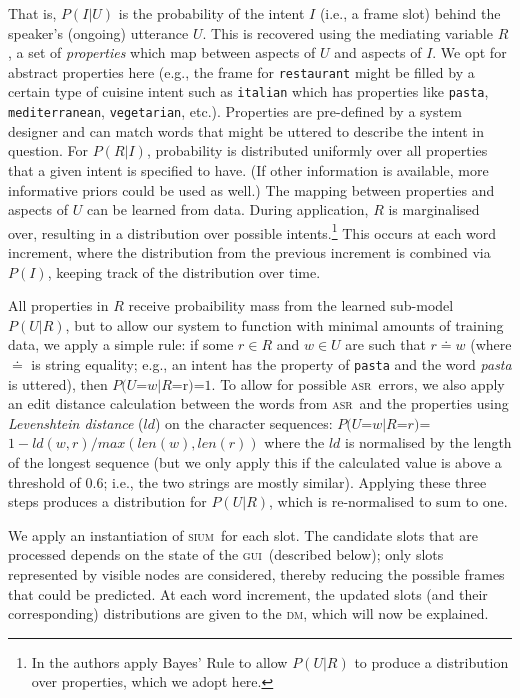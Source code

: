 \documentclass[11pt]{article}
\newcommand{\sium}[0]{\textsc{sium}}
\newcommand{\asr}[0]{\textsc{asr}}
\newcommand{\dm}[0]{\textsc{dm}}
\newcommand{\ui}[0]{\textsc{gui}}
\begin{document}
That is, $P(I|U)$ is the probability of the intent $I$ (i.e., a frame slot) behind the speaker's (ongoing) utterance $U$. This is recovered using the mediating variable $R$, a set of \emph{properties} which map between aspects of $U$ and aspects of $I$. We opt for abstract properties here (e.g., the frame for \texttt{restaurant} might be filled by a certain type of cuisine intent such as \texttt{italian} which has properties like \texttt{pasta}, \texttt{mediterranean}, \texttt{vegetarian}, etc.). Properties are pre-defined by a system designer and can match words that might be uttered to describe the intent in question. For $P(R|I)$, probability is distributed uniformly over all properties that a given intent is specified to have. (If other information is available, more informative priors could be used as well.) The mapping between properties and aspects of $U$ can be learned from data. During application, $R$ is marginalised over, resulting in a distribution over possible intents.\footnote{In  the authors apply Bayes' Rule to allow $P(U|R)$ to produce a distribution over properties, which we adopt here.} This occurs at each word increment, where the distribution from the previous increment is combined via $P(I)$, keeping track of the distribution over time. 

All properties in $R$ receive probaibility mass from the learned sub-model $P(U|R)$, but to allow our system to function with minimal amounts of training data, we apply a simple rule: if some $r \in R$ and $w \in U$ are such that $r\doteq w$  (where $\doteq$ is string equality; e.g., an intent has the property of \texttt{pasta} and the word \emph{pasta} is uttered), then $P(U$=$w|R$=r$)$=$1$. To allow for possible \asr\ errors, we also apply an edit distance calculation between the words from \asr\ and the properties using \emph{Levenshtein distance} ($ld$) on the character sequences: $P(U$=$w|R$=$r)$=$1 - ld(w,r) / max(len(w),len(r))$ where the $ld$ is normalised by the length of the longest sequence (but we only apply this if the calculated value is above a threshold of 0.6; i.e., the two strings are mostly similar). Applying these three steps produces a distribution for $P(U|R)$, which is re-normalised to sum to one.

We apply an instantiation of \sium\ for each slot. The candidate slots that are processed depends on the state of the \ui\ (described below); only slots represented by visible nodes are considered, thereby reducing the possible frames that could be predicted. At each word increment, the updated slots (and their corresponding) distributions are given to the \dm, which will now be explained. 
\end{document}
